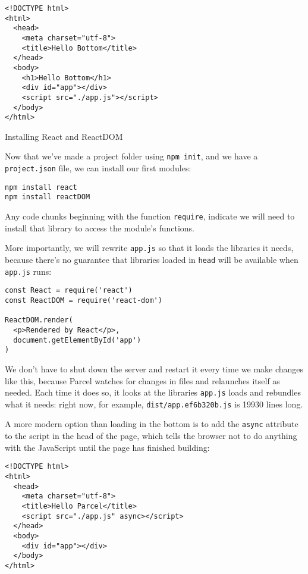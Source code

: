 \begin{verbatim}
<!DOCTYPE html>
<html>
  <head>
    <meta charset="utf-8">
    <title>Hello Bottom</title>
  </head>
  <body>
    <h1>Hello Bottom</h1>
    <div id="app"></div>
    <script src="./app.js"></script>
  </body>
</html>
\end{verbatim}


\begin{aside}{Installing React and ReactDOM}

Now that we've made a project folder using \texttt{npm init},
and we have a \texttt{project.json} file,
we can install our first modules:

\begin{verbatim}
npm install react
npm install reactDOM
\end{verbatim}

Any code chunks beginning with the function \texttt{require},
indicate we will need to install that library to access the module's functions.

\end{aside}

More importantly,
we will rewrite \texttt{app.js} so that it loads the libraries it needs,
because there's no guarantee that libraries loaded in \texttt{head} will be available when \texttt{app.js} runs:

\begin{verbatim}
const React = require('react')
const ReactDOM = require('react-dom')

ReactDOM.render(
  <p>Rendered by React</p>,
  document.getElementById('app')
)
\end{verbatim}

We don't have to shut down the server and restart it every time we make changes like this,
because Parcel watches for changes in files and relaunches itself as needed.
Each time it does so,
it looks at the libraries \texttt{app.js} loads and rebundles what it needs:
right now,
for example,
\texttt{dist/app.ef6b320b.js} is 19930 lines long.

A more modern option than loading in the bottom is to add the \texttt{async} attribute to the script in the head of the page,
which tells the browser not to do anything with the JavaScript until the page has finished building:

\begin{verbatim}
<!DOCTYPE html>
<html>
  <head>
    <meta charset="utf-8">
    <title>Hello Parcel</title>
    <script src="./app.js" async></script>
  </head>
  <body>
    <div id="app"></div>
  </body>
</html>
\end{verbatim}

